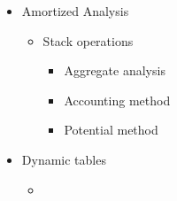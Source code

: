 \begin{itemize}
  \item Amortized Analysis
  \begin{itemize}
    \item Stack operations
    \begin{itemize}
      \item Aggregate analysis
      \item Accounting method
      \item Potential method
    \end{itemize}
  \end{itemize}
  \item Dynamic tables
  \begin{itemize}
    \item
  \end{itemize}
\end{itemize}
